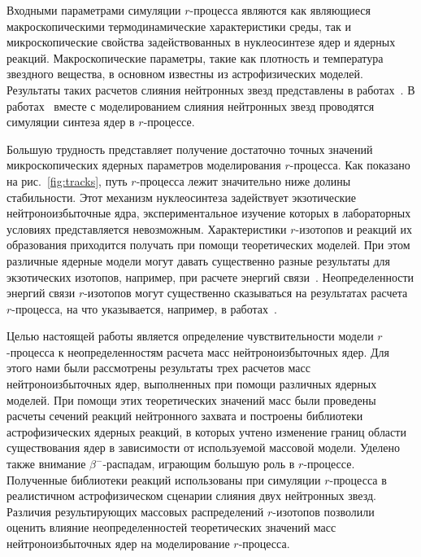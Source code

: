 Входными параметрами симуляции $r$-процесса являются как являющиеся макроскопическими термодинамические характеристики среды, так и микроскопические свойства задействованных в нуклеосинтезе ядер и ядерных реакций. Макроскопические параметры, такие как плотность и температура звездного вещества, в основном известны из астрофизических моделей. Результаты таких расчетов слияния нейтронных звезд представлены в работах~\cite{rosswog1999,rosswog2013}. В работах~\cite{korobkin2012,rosswog2014,kullman2021} вместе с моделированием слияния нейтронных звезд проводятся симуляции синтеза ядер в $r$-процессе.

Большую трудность представляет получение достаточно точных значений микроскопических ядерных параметров моделирования $r$-процесса. Как показано на рис.~\ref{fig:tracks}, путь $r$-процесса лежит значительно ниже долины стабильности. Этот механизм нуклеосинтеза задействует экзотические нейтроноизбыточные ядра, экспериментальное изучение которых в лабораторных условиях представляется невозможным. Характеристики $r$-изотопов и реакций их образования приходится получать при помощи теоретических моделей. При этом различные ядерные модели могут давать существенно разные результаты для экзотических изотопов, например, при расчете энергий связи~\cite{sobiczewski2018}. Неопределенности энергий связи $r$-изотопов могут существенно сказываться на результатах расчета $r$-процесса, на что указывается, например, в работах~\cite{goriely2001,brett2012}.

Целью настоящей работы является определение чувствительности модели $r$-процесса к неопределенностям расчета масс нейтроноизбыточных ядер. Для этого нами были рассмотрены результаты трех расчетов масс нейтроноизбыточных ядер, выполненных при помощи различных ядерных моделей. При помощи этих теоретических значений масс были проведены расчеты сечений реакций нейтронного захвата и построены библиотеки астрофизических ядерных реакций, в которых учтено изменение границ области существования ядер в зависимости от используемой массовой модели. Уделено также внимание $\beta^-$-распадам, играющим большую роль в $r$-процессе. Полученные библиотеки реакций использованы при симуляции $r$-процесса в реалистичном астрофизическом сценарии слияния двух нейтронных звезд. Различия результирующих массовых распределений $r$-изотопов позволили оценить влияние неопределенностей теоретических значений масс нейтроноизбыточных ядер на моделирование $r$-процесса.
